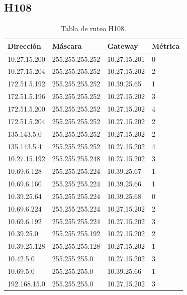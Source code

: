 \documentclass[12pt,titlepage]{article}
\begin{document}
\subsection{H108}
\begin{table}
  \begin{center}
    \begin{tabular}{|l|l|l|l|}
      \hline
        \bf{Direcci\'on} & \bf{M\'ascara} & \bf{Gateway} & \bf{M\'etrica} \\
      \hline 
	10.27.15.200  & 255.255.255.252 & 10.27.15.201 & 0 \\
        10.27.15.204  & 255.255.255.252 & 10.27.15.202 & 2 \\
        172.51.5.192  & 255.255.255.252 & 10.39.25.65 & 1 \\
        172.51.5.196  & 255.255.255.252 & 10.27.15.202 & 3 \\
        172.51.5.200  & 255.255.255.252 & 10.27.15.202 & 4 \\
        172.51.5.204  & 255.255.255.252 & 10.27.15.202 & 2 \\
        135.143.5.0   & 255.255.255.252 & 10.27.15.202 & 2 \\
        135.143.5.4   & 255.255.255.252 & 10.27.15.202 & 4 \\ 	
	10.27.15.192  & 255.255.255.248 & 10.27.15.202 & 3 \\
	10.69.6.128   & 255.255.255.224 & 10.39.25.67 & 1 \\
        10.69.6.160   & 255.255.255.224 & 10.39.25.66 & 1 \\
	10.39.25.64   & 255.255.255.224 & 10.39.25.68 & 0 \\       
	10.69.6.224   & 255.255.255.224 & 10.27.15.202 & 2 \\
	10.69.6.192   & 255.255.255.224 & 10.27.15.202 & 3 \\	
	10.39.25.0    & 255.255.255.192 & 10.27.15.202 & 2 \\
	10.39.25.128  & 255.255.255.128 & 10.27.15.202 & 1 \\
	10.42.5.0     & 255.255.255.0 & 10.27.15.202 & 3 \\
        10.69.5.0     & 255.255.255.0 & 10.39.25.66 & 1 \\
        192.168.15.0  & 255.255.255.0 & 10.27.15.202 & 3 \\  
    \hline
    \end{tabular} \\
  \end{center}
  \caption{Tabla de ruteo H108.}
\end{table}
\FloatBarrier
\end{document}
